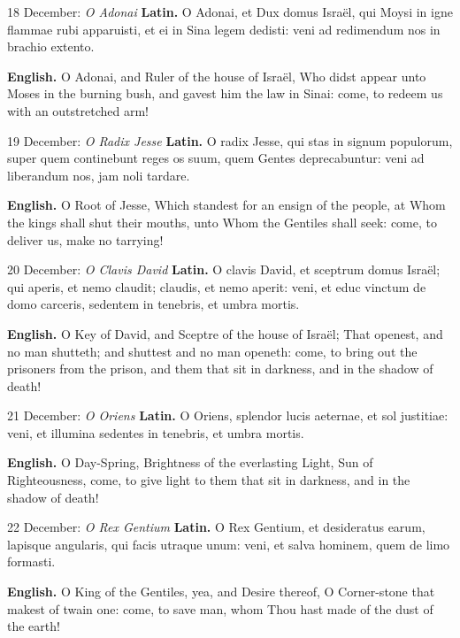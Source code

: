 \begin{massbox}{18 December: \textit{O Adonai}}
\textbf{Latin.} O Adonai, et Dux domus Isra\"el, qui Moysi in igne flammae rubi
apparuisti, et ei in Sina legem dedisti: veni ad redimendum nos in brachio
extento.

\textbf{English.} O Adonai, and Ruler of the house of Isra\"el, Who didst appear
unto Moses in the burning bush, and gavest him the law in Sinai: come, to redeem
us with an outstretched arm!
\end{massbox}

\begin{massbox}{19 December: \textit{O Radix Jesse}}
\textbf{Latin.} O radix Jesse, qui stas in signum populorum, super quem
continebunt reges os suum, quem Gentes deprecabuntur: veni ad liberandum nos,
jam noli tardare.

\textbf{English.} O Root of Jesse, Which standest for an ensign of the people,
at Whom the kings shall shut their mouths, unto Whom the Gentiles shall seek:
come, to deliver us, make no tarrying!
\end{massbox}

\begin{massbox}{20 December: \textit{O Clavis David}}
\textbf{Latin.} O clavis David, et sceptrum domus Isra\"el; qui aperis, et nemo
claudit; claudis, et nemo aperit: veni, et educ vinctum de domo carceris,
sedentem in tenebris, et umbra mortis.

\textbf{English.} O Key of David, and Sceptre of the house of Isra\"el; That
openest, and no man shutteth; and shuttest and no man openeth: come, to bring
out the prisoners from the prison, and them that sit in darkness, and in the
shadow of death!
\end{massbox}

\begin{massbox}{21 December: \textit{O Oriens}}
\textbf{Latin.} O Oriens, splendor lucis aeternae, et sol justitiae: veni, et
illumina sedentes in tenebris, et umbra mortis.

\textbf{English.} O Day-Spring, Brightness of the everlasting Light, Sun of
Righteousness, come, to give light to them that sit in darkness, and in the
shadow of death!
\end{massbox}

\begin{massbox}{22 December: \textit{O Rex Gentium}}
\textbf{Latin.} O Rex Gentium, et desideratus earum, lapisque angularis, qui
facis utraque unum: veni, et salva hominem, quem de limo formasti.

\textbf{English.} O King of the Gentiles, yea, and Desire thereof, O
Corner-stone that makest of twain one: come, to save man, whom Thou hast made of
the dust of the earth!
\end{massbox}

